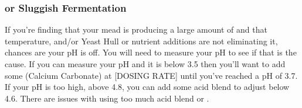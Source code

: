 \documentclass{article}
\begin{document}
  \subsubsection{ or Sluggish Fermentation}
   If you're finding that your mead is producing a large amount of  and that temperature, and/or Yeast Hull or nutrient additions are not eliminating it, 
   chances are your pH is off. You will need to measure your pH to see if that is the cause. If you can measure your pH and it is
   below 3.5 then you'll want to add some  (Calcium Carbonate) at [DOSING RATE] until you've reached a pH of 3.7. If your pH is too high, above 4.8, 
   you can add some acid blend to adjust below 4.6. There are issues with using too much acid blend or .
\end{document}
